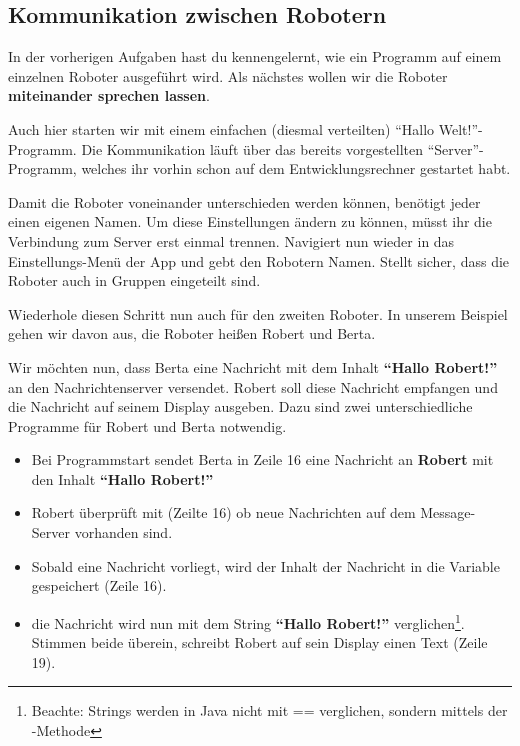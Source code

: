 \subsection{Kommunikation zwischen Robotern} %
	In der vorherigen Aufgaben hast du kennengelernt, wie ein Programm auf einem einzelnen Roboter ausgeführt wird. Als nächstes wollen wir die Roboter \textbf{miteinander sprechen lassen}.
	
	Auch hier starten wir mit einem einfachen (diesmal verteilten) “Hallo Welt!”-Programm. Die Kommunikation läuft über das bereits vorgestellten “Server”-Programm, welches ihr vorhin schon auf dem Entwicklungsrechner gestartet habt. 
	
	Damit die Roboter voneinander unterschieden werden können, benötigt jeder einen eigenen Namen. Um diese Einstellungen ändern zu können, müsst ihr die Verbindung zum Server erst einmal trennen. Navigiert nun wieder in das Einstellungs-Menü der App und gebt den Robotern Namen. Stellt sicher, dass die Roboter auch in Gruppen eingeteilt sind. 
	
	Wiederhole diesen Schritt nun auch für den zweiten Roboter. In unserem Beispiel gehen wir davon aus, die Roboter heißen Robert und Berta.
	
	Wir möchten nun, dass Berta eine Nachricht mit dem Inhalt \textbf{``Hallo Robert!''} an den Nachrichtenserver versendet. Robert soll diese Nachricht empfangen und die Nachricht auf seinem Display ausgeben. 
	Dazu sind zwei unterschiedliche Programme für Robert und Berta notwendig.
	
	\begin{itemize}
	\item Bei Programmstart sendet Berta in Zeile 16 eine Nachricht an \textbf{Robert }mit den Inhalt \textbf{``Hallo Robert!''}
	\end{itemize}
	
	
	
	\begin{itemize}
	\item Robert überprüft mit  (Zeilte 16) ob neue Nachrichten auf dem Message-Server vorhanden sind. 
	\item Sobald eine Nachricht vorliegt, wird der Inhalt der Nachricht in die Variable  gespeichert (Zeile 16).
	\item die Nachricht wird nun mit dem String \textbf{``Hallo Robert!''} verglichen\footnote{Beachte: Strings werden in Java nicht mit == verglichen, sondern mittels der -Methode}. Stimmen beide überein, schreibt Robert auf sein Display einen Text (Zeile 19).
	\end{itemize}